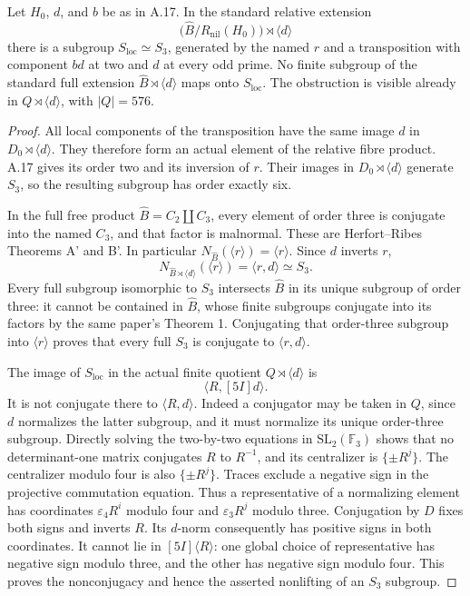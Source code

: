 Let \(H_0\), \(d\), and \(b\) be as in A.17. In the standard
relative extension
\[
 \bigl(\widehat B/R_{\mathrm{nil}}(H_0)\bigr)
                  \rtimes\langle d\rangle
\]
there is a subgroup \(S_{\mathrm{loc}}\simeq S_3\), generated
by the named \(r\) and a transposition with component \(bd\)
at two and \(d\) at every odd prime. No finite subgroup
of the standard full extension
\(\widehat B\rtimes\langle d\rangle\) maps onto
\(S_{\mathrm{loc}}\). The obstruction is visible already in
\(Q\rtimes\langle d\rangle\), with \(|Q|=576\).

\begin{proof}
All local components of the transposition have the same
image \(d\) in \(D_0\rtimes\langle d\rangle\).
They therefore form an actual element of the relative fibre
product. A.17 gives its order two and its inversion of \(r\).
Their images in \(D_0\rtimes\langle d\rangle\) generate
\(S_3\), so the resulting subgroup has order exactly six.

In the full free product \(\widehat B=C_2\amalg C_3\),
every element of order three is conjugate into the named
\(C_3\), and that factor is malnormal. These are
Herfort--Ribes Theorems A' and B'.\cite{A_HR1985}
In particular \(N_{\widehat B}(\langle r\rangle)=\langle r\rangle\).
Since \(d\) inverts \(r\),
\[
 N_{\widehat B\rtimes\langle d\rangle}(\langle r\rangle)
                         =\langle r,d\rangle\simeq S_3.
\]
Every full subgroup isomorphic to \(S_3\) intersects
\(\widehat B\) in its unique subgroup of order three:
it cannot be contained in \(\widehat B\), whose finite
subgroups conjugate into its factors by the same paper's
Theorem 1. Conjugating that order-three subgroup into
\(\langle r\rangle\) proves that every full \(S_3\)
is conjugate to \(\langle r,d\rangle\).

The image of \(S_{\mathrm{loc}}\) in the actual finite
quotient \(Q\rtimes\langle d\rangle\) is
\[
                   \langle R,[5I]d\rangle .
\]
It is not conjugate there to \(\langle R,d\rangle\).
Indeed a conjugator may be taken in \(Q\), since \(d\)
normalizes the latter subgroup, and it must normalize
its unique order-three subgroup. Directly solving the
two-by-two equations in \(\mathrm{SL}_2(\mathbb F_3)\)
shows that no determinant-one matrix conjugates \(R\)
to \(R^{-1}\), and its centralizer is \(\{\pm R^j\}\).
The centralizer modulo four is also \(\{\pm R^j\}\).
Traces exclude a negative sign in the projective
commutation equation. Thus a representative of a
normalizing element has coordinates
\(\varepsilon_4R^i\) modulo four and
\(\varepsilon_3R^j\) modulo three.
Conjugation by \(D\) fixes both signs and inverts \(R\).
Its \(d\)-norm consequently has positive signs in both
coordinates. It cannot lie in \([5I]\langle R\rangle\):
one global choice of representative has negative sign
modulo three, and the other has negative sign modulo four.
This proves the nonconjugacy and hence the asserted
nonlifting of an \(S_3\) subgroup.


\end{proof}
